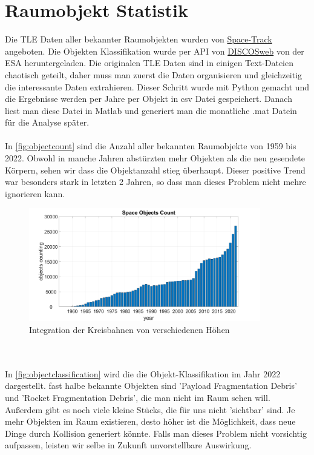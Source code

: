 \documentclass{article}
\begin{document}
\section{Raumobjekt Statistik}
Die TLE Daten aller bekannter Raumobjekten wurden von \href{https://www.space-track.org/auth/login}{Space-Track} angeboten. Die Objekten Klassifikation wurde per API von \href{https://discosweb.esoc.esa.int/}{DISCOSweb} von der ESA heruntergeladen. Die originalen TLE Daten sind in einigen Text-Dateien chaotisch geteilt, daher muss man zuerst die Daten organisieren und gleichzeitig die interessante Daten extrahieren. Dieser Schritt wurde mit Python gemacht und die Ergebnisse werden per Jahre per Objekt in csv Datei gespeichert. Danach liest man diese Datei in Matlab und generiert man die monatliche .mat Datein für die Analyse später.
\\\\
In \autoref{fig:objectcount} sind die Anzahl aller bekannten Raumobjekte von 1959 bis 2022. Obwohl in manche Jahren abstürzten mehr Objekten als die neu gesendete Körpern, sehen wir dass die Objektanzahl stieg überhaupt. Dieser positive Trend war besonders stark in letzten 2 Jahren, so dass man dieses Problem nicht mehre ignorieren kann. 
\begin{figure}[ht]\centering 
	\includegraphics[width=0.9\textwidth]{images/all_obj_counts.png}
	\caption{Integration der Kreisbahnen von verschiedenen Höhen}
	\label{fig:objectcount}
\end{figure}
\\\\
In \autoref{fig:objectclassification} wird die die Objekt-Klassifikation im Jahr 2022 dargestellt. fast halbe bekannte Objekten sind 'Payload Fragmentation Debris' und 'Rocket Fragmentation Debris', die man nicht im Raum sehen will. Außerdem gibt es noch viele kleine Stücks, die für uns nicht 'sichtbar' sind. Je mehr Objekten im Raum existieren, desto höher ist die Möglichkeit, dass neue Dinge durch Kollision generiert könnte. Falls man dieses Problem nicht vorsichtig aufpassen, leisten wir selbe in Zukunft unvorstellbare Auswirkung.
\end{document}
